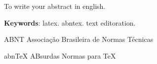 \documentclass[
	12pt,				%
	openright,			%
	oneside,			%
	a4paper,			%
	sumario=tradicional, %
	english,			%
	french,				%
	spanish,			%
	brazil				%
	]{uastex}
\begin{document}
\begin{resumo}[ABSTRACT]
To write your abstract in english.

\vspace{\onelineskip}

\noindent 
\textbf{Keywords}: latex. abntex. text editoration.
\end{resumo}


\listoffigures*
\cleardoublepage

\listofquadros*
\cleardoublepage

\listoftables*
\cleardoublepage

\begin{siglas}
  \item[ABNT] Associação Brasileira de Normas Técnicas
  \item[abnTeX] ABsurdas Normas para TeX
\end{siglas}


\tableofcontents*
\cleardoublepage



\textual
\begin{capitulos}
	
	
	
\end{capitulos}


\end{document}
